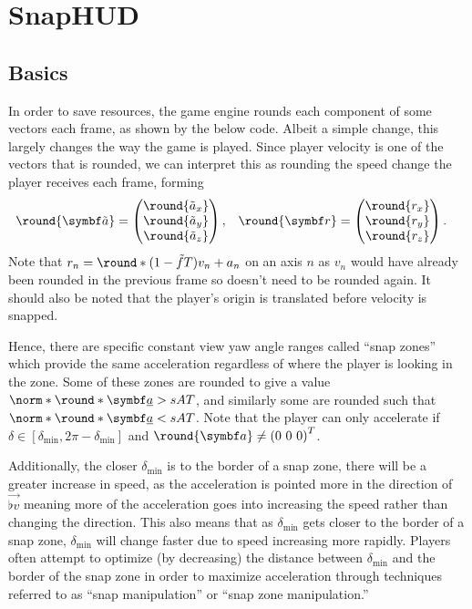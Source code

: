 \section{SnapHUD}
\label{sec:snaphud}

\subsection{Basics}
\label{sec:snap_basics}
In order to save resources, the game engine rounds each component of some vectors each frame, as shown by the below code. Albeit a simple change, this largely changes the way the game is played.
Since player velocity is one of the vectors that is rounded, we can interpret this as rounding the speed change the player receives each frame, forming
\begin{align*}
\round{\vec{\tilde{a}}} &=
\begin{pmatrix}
\round{\tilde{a}_x} \\ \round{\tilde{a}_y} \\ \round{\tilde{a}_z}
\end{pmatrix}, & \round{\vec{r}} &=
\begin{pmatrix}
\round{r_x} \\ \round{r_y} \\ \round{r_z}
\end{pmatrix}.
\end{align*}
Note that $r_n = \round*{(1 - \tilde{f}T) v_n + a_n}$ on an axis $n$ as $v_n$ would have already been rounded in the previous frame so doesn't need to be rounded again.
It should also be noted that the player's origin is translated before velocity is snapped.

Hence, there are specific constant view yaw angle ranges called ``snap zones'' which provide the same acceleration regardless of where the player is looking in the zone.
Some of these zones are rounded to give a value $\norm*{\round*{\vec{\flat{a}}}} > sAT$, and similarly some are rounded such that $\norm*{\round*{\vec{\flat{a}}}} < sAT$.
Note that the player can only accelerate if $\delta \in [\delta_{\min}, 2\pi - \delta_{\min}]$ and $\round{\vec{a}} \neq \inlinemat{0, 0, 0}^T$.

Additionally, the closer $\delta_{\min}$ is to the border of a snap zone, there will be a greater increase in speed, as the acceleration is pointed more in the direction of $\vec{\flat{v}}$ meaning more of the acceleration goes into increasing the speed rather than changing the direction.
This also means that as $\delta_{\min}$ gets closer to the border of a snap zone, $\delta_{\min}$ will change faster due to speed increasing more rapidly.
Players often attempt to optimize (by decreasing) the distance between $\delta_{\min}$ and the border of the snap zone in order to maximize acceleration through techniques referred to as ``snap manipulation'' or ``snap zone manipulation.''\\

